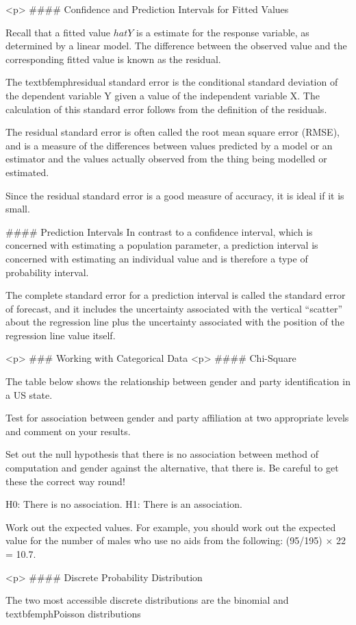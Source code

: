 <p>
#### {Confidence and Prediction Intervals for Fitted Values} 

Recall that a fitted value $hat{Y}$ is a estimate for the response variable, as determined by a linear model. The difference between the observed value and the corresponding fitted value is known as the residual.

The textbf{emph{residual standard error}} is the conditional standard deviation of the dependent variable Y given a value of the independent variable X. The calculation of this standard error follows from the definition of the residuals.

The residual standard error is often called the root mean square error (RMSE), and is a measure of the differences between values predicted by a model or an estimator and the values actually observed from the thing being modelled or estimated.

Since the residual standard error is a good measure of accuracy, it is ideal if it is small.


#### {Prediction Intervals}
In contrast to a confidence interval, which is concerned with estimating a population parameter, a prediction interval is concerned with estimating an individual value and is therefore a type of probability interval. 

The complete standard error for a prediction interval is called the standard error of forecast, and it includes the uncertainty associated with the vertical “scatter” about the regression line plus the uncertainty associated with the position of the regression line value itself.










<p>
### {Working with Categorical Data}
<p>
#### {Chi-Square}

The table below shows the relationship between gender and party identification in a US state.



Test for association between gender and party affiliation at two appropriate levels
and comment on your results.

Set out the null hypothesis that there is no association between method of computation
and gender against the alternative, that there is. Be careful to get these the correct way
round!

H0: There is no association.
H1: There is an association.

Work out the expected values. For example, you should work out the expected value for
the number of males who use no aids from the following: (95/195) × 22 = 10.7.

<p>
#### {Discrete Probability Distribution}


The two most accessible discrete distributions are the binomial and textbf{emph{Poisson}} distributions


